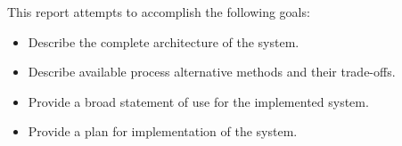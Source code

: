 This report attempts to accomplish the following goals:
\begin{itemize}
  \item Describe the complete architecture of the system.
  \item Describe available process alternative methods and their trade-offs.
  \item Provide a broad statement of use for the implemented system.
  \item Provide a plan for implementation of the system.
\end{itemize}